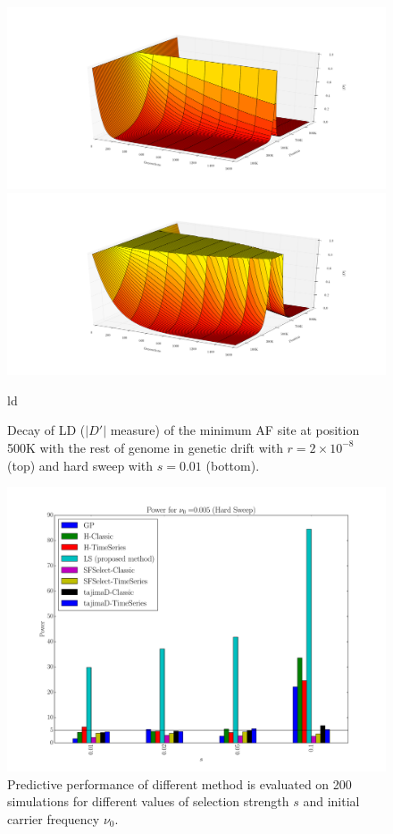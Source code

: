\documentclass[11pt]{article}
\begin{document}
\begin{figure}[H]
	\centering
	\includegraphics[width=\textwidth]{LDDecay3dNeutral}
	\includegraphics[width=\textwidth]{LDDecay3dSweep}
	\caption{ld} \label{fig:ld3d}
	\caption{Decay of LD ($|D'|$ measure) of the minimum AF site at 
		position 500K with the rest of genome in genetic drift with 
		$r=2\times10^{-8}$ (top) and hard sweep with $s=0.01$ (bottom).}
\end{figure}
\begin{figure}[H]
	\centering
	\includegraphics[trim=2.2in 0 2.2in 0 , clip,width=\textwidth]{power}
	\caption{Predictive performance of different method is evaluated on 200 
		simulations for different values of selection strength $s$ and initial 
		carrier frequency $\nu_0$.} \label{fig:power}
\end{figure}
\end{document}
